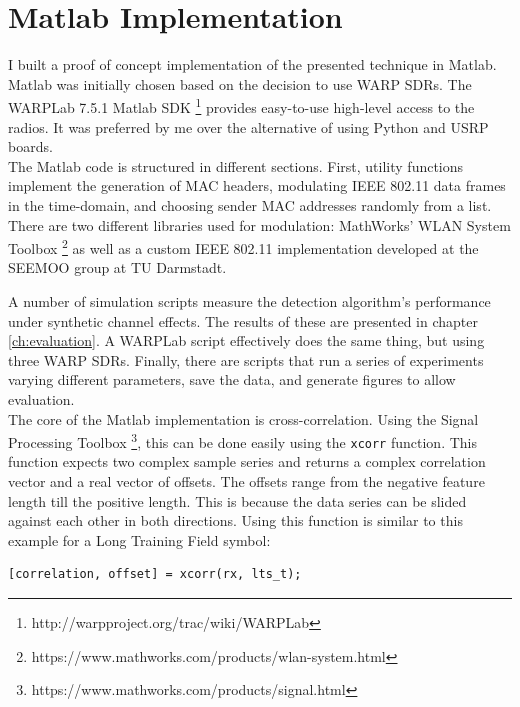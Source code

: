 
\section{Matlab Implementation}\label{sec:matlab-impl}

I built a proof of concept implementation of the presented technique in Matlab. Matlab was initially chosen based on the decision to use \gls{WARP} \glspl{SDR}. The WARPLab 7.5.1 Matlab \gls{SDK} \footnote{http://warpproject.org/trac/wiki/WARPLab} provides easy-to-use high-level access to the radios. It was preferred by me over the alternative of using Python and \gls{USRP} boards.\\

The Matlab code is structured in different sections. First, utility functions implement the generation of MAC headers, modulating IEEE 802.11 data frames in the time-domain, and choosing sender MAC addresses randomly from a list. There are two different libraries used for modulation: MathWorks' WLAN System Toolbox \footnote{https://www.mathworks.com/products/wlan-system.html} as well as a custom IEEE 802.11 implementation developed at the \gls{SEEMOO} group at TU Darmstadt.

A number of simulation scripts measure the detection algorithm's performance under synthetic channel effects. The results of these are presented in chapter \ref{ch:evaluation}. A WARPLab script effectively does the same thing, but using three \gls{WARP} \glspl{SDR}. Finally, there are scripts that run a series of experiments varying different parameters, save the data, and generate figures to allow evaluation.\\

The core of the Matlab implementation is cross-correlation. Using the Signal Processing Toolbox \footnote{https://www.mathworks.com/products/signal.html}, this can be done easily using the \texttt{xcorr} function. This function expects two complex sample series and returns a complex correlation vector and a real vector of offsets. The offsets range from the negative feature length till the positive length. This is because the data series can be slided against each other in both directions. Using this function is similar to this example for a Long Training Field symbol:\\

\begin{lstlisting}[captionpos=b,caption={Cross-Correlation of an LTF Symbol},label=lst:xcorr]
[correlation, offset] = xcorr(rx, lts_t);
\end{lstlisting}

